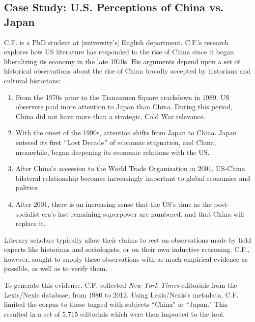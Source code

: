 \documentclass{sig-alternate}
\begin{document}
\subsection{Case Study: U.S. Perceptions of China vs. Japan}

C.F. is a PhD student at [university's] English department. C.F.'s research explores how US literature has responded to the rise of China since it began liberalizing its economy in the late 1970s.  His arguments depend upon a set of historical observations about the rise of China  broadly accepted by historians and cultural historians: 
\begin{enumerate}
\item From the 1970s prior to the Tiananmen Square crackdown in 1989, US observers paid more attention to Japan than China. During this period, China did not have  more than a strategic, Cold War relevance. 
\item With the onset of the 1990s, attention shifts from Japan to China. Japan entered its first ``Lost Decade'' of economic stagnation, and China, meanwhile, began deepening its economic relations with the US.
\item After China's accession to the World Trade Organization in 2001, US-China bilateral relationship becomes increasingly important to global economics and politics.
\item After 2001, there is an increasing sense that the US's time as the post-socialist era's last remaining superpower are numbered, and that China will replace it.
\end{enumerate}
Literary scholars typically allow their claims to rest on observations made by field experts like historians and sociologists, or on their own inductive reasoning. C.F., however, sought to supply these observations with as much empirical evidence as possible, as well as to verify them.

To generate this evidence, C.F. collected \emph{New York Times} editorials from  the Lexis/Nexis database, from 1980 to 2012. Using Lexis/Nexis's metadata, C.F. limited the corpus to those tagged with subjects ``China" or ``Japan." This resulted in a set of 5,715 editorials which were then imported to the tool.
\end{document}
